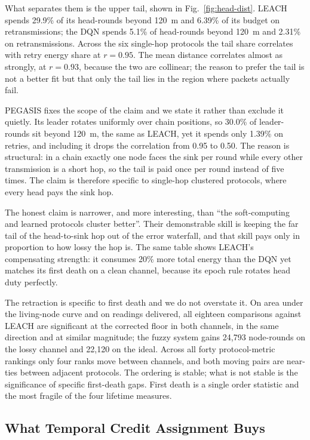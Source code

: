 What separates them is the upper tail, shown in Fig.~\ref{fig:head-dist}. LEACH
spends 29.9\% of its head-rounds beyond 120~m and 6.39\% of its budget on
retransmissions; the DQN spends 5.1\% of head-rounds beyond 120~m and 2.31\% on
retransmissions. Across the six single-hop protocols the tail share correlates
with retry energy share at $r = 0.95$. The mean distance correlates almost as
strongly, at $r = 0.93$, because the two are collinear; the reason to prefer the
tail is not a better fit but that only the tail lies in the region where packets
actually fail.

PEGASIS fixes the scope of the claim and we state it rather than exclude it
quietly. Its leader rotates uniformly over chain positions, so 30.0\% of
leader-rounds sit beyond 120~m, the same as LEACH, yet it spends only 1.39\% on
retries, and including it drops the correlation from 0.95 to 0.50. The reason is
structural: in a chain exactly one node faces the sink per round while every
other transmission is a short hop, so the tail is paid once per round instead of
five times. The claim is therefore specific to single-hop clustered protocols,
where every head pays the sink hop.

The honest claim is narrower, and more interesting, than ``the soft-computing
and learned protocols cluster better''. Their demonstrable skill is keeping the
far tail of the head-to-sink hop out of the error waterfall, and that skill pays
only in proportion to how lossy the hop is. The same table shows LEACH's
compensating strength: it consumes 20\% more total energy than the DQN yet
matches its first death on a clean channel, because its epoch rule rotates head
duty perfectly.

The retraction is specific to first death and we do not overstate it. On area
under the living-node curve and on readings delivered, all eighteen comparisons
against LEACH are significant at the corrected floor in both channels, in the
same direction and at similar magnitude; the fuzzy system gains 24{,}793
node-rounds on the lossy channel and 22{,}120 on the ideal. Across all forty
protocol-metric rankings only four ranks move between channels, and both moving
pairs are near-ties between adjacent protocols. The ordering is stable; what is
not stable is the significance of specific first-death gaps. First death is a
single order statistic and the most fragile of the four lifetime measures.

\subsection{What Temporal Credit Assignment Buys}
\label{sec:credit}


